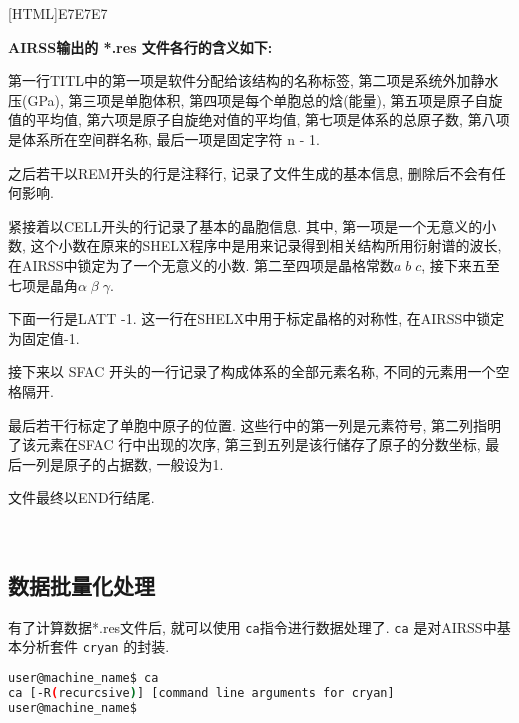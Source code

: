\documentclass[a4paper, 10pt]{article}
\begin{document}
\noindent{}[HTML]{E7E7E7}{\parbox{\textwidth}{%
\noindent \textbf{AIRSS输出的 *.res 文件各行的含义如下:}
\begin{maineu}
\item 第一行TITL中的第一项是软件分配给该结构的名称标签, 第二项是系统外加静水压(GPa), 第三项是单胞体积, 第四项是每个单胞总的焓(能量), 第五项是原子自旋值的平均值, 第六项是原子自旋绝对值的平均值, 第七项是体系的总原子数, 第八项是体系所在空间群名称, 最后一项是固定字符 n - 1.
\item 之后若干以REM开头的行是注释行, 记录了文件生成的基本信息, 删除后不会有任何影响.
\item 紧接着以CELL开头的行记录了基本的晶胞信息. 其中, 第一项是一个无意义的小数, 这个小数在原来的SHELX程序中是用来记录得到相关结构所用衍射谱的波长, 在AIRSS中锁定为了一个无意义的小数. 第二至四项是晶格常数\(a\;b\;c\), 接下来五至七项是晶角\(\alpha\;\beta\;\gamma\).
\item 下面一行是LATT -1. 这一行在SHELX中用于标定晶格的对称性, 在AIRSS中锁定为固定值-1.
\item 接下来以 SFAC 开头的一行记录了构成体系的全部元素名称, 不同的元素用一个空格隔开.
\item 最后若干行标定了单胞中原子的位置. 这些行中的第一列是元素符号, 第二列指明了该元素在SFAC 行中出现的次序, 第三到五列是该行储存了原子的分数坐标, 最后一列是原子的占据数, 一般设为1.
\item 文件最终以END行结尾.
\end{maineu}}}\\

\subsection{数据批量化处理}
有了计算数据*.res文件后, 就可以使用 \verb|ca|指令进行数据处理了. \verb|ca| 是对AIRSS中基本分析套件 \verb|cryan| 的封装. 
\begin{lstlisting}[language={bash}]
user@machine_name$ ca
ca [-R(recurcsive)] [command line arguments for cryan]
user@machine_name$
\end{lstlisting}
\end{document}
